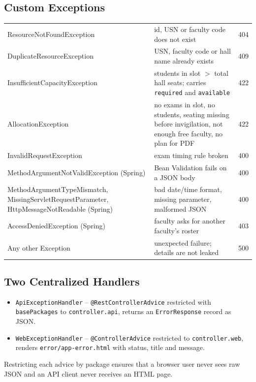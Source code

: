 \documentclass[11pt,a4paper]{article}
\begin{document}
\subsection{Custom Exceptions}
\begin{tabularx}{\linewidth}{|L{4.6cm}|X|l|}
\hline\headrow{} &  & \\\hline
ResourceNotFoundException & id, USN or faculty code does not exist & 404\\\hline
DuplicateResourceException & USN, faculty code or hall name already exists & 409\\\hline
InsufficientCapacityException & students in slot $>$ total hall seats; carries \texttt{required} and \texttt{available} & 422\\\hline
AllocationException & no exams in slot, no students, seating missing before invigilation, not enough free faculty, no plan for PDF & 422\\\hline
InvalidRequestException & exam timing rule broken & 400\\\hline
MethodArgumentNotValidException (Spring) & Bean Validation fails on a JSON body & 400\\\hline
MethodArgumentTypeMismatch, MissingServletRequestParameter, HttpMessageNotReadable (Spring) & bad date/time format, missing parameter, malformed JSON & 400\\\hline
AccessDeniedException (Spring) & faculty asks for another faculty's roster & 403\\\hline
Any other Exception & unexpected failure; details are not leaked & 500\\\hline
\end{tabularx}

\subsection{Two Centralized Handlers}
\begin{itemize}
  \item \texttt{ApiExceptionHandler} -- \texttt{@RestControllerAdvice} restricted with \texttt{basePackages} to \texttt{controller.api}, returns an \texttt{ErrorResponse} record as JSON.
  \item \texttt{WebExceptionHandler} -- \texttt{@ControllerAdvice} restricted to \texttt{controller.web}, renders \texttt{error/app-error.html} with status, title and message.
\end{itemize}
Restricting each advice by package ensures that a browser user never sees raw JSON and an API client never receives an HTML page.
\end{document}
